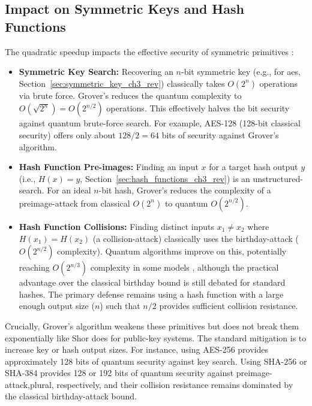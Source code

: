 \subsection{Impact on Symmetric Keys and Hash Functions}\label{subsec:grover_impact_specific_ch5_rev}
\begin{sloppypar}
The quadratic speedup impacts the effective security of symmetric primitives \parencite{bernstein2017post}:
\begin{itemize}
    \item \textbf{Symmetric Key Search:} Recovering an $n$-bit symmetric key (e.g., for \gls{aes}, Section~\ref{sec:symmetric_key_ch3_rev}) classically takes $O(2^n)$ operations via brute force. Grover's reduces the quantum complexity to $O(\sqrt{2^n}) = O(2^{n/2})$ operations. This effectively halves the bit security against quantum brute-force search. For example, AES-128 (128-bit classical security) offers only about $128/2 = 64$ bits of security against Grover's algorithm.
    \item \textbf{Hash Function Pre-images:} Finding an input $x$ for a target hash output $y$ (i.e., $H(x)=y$, Section~\ref{sec:hash_functions_ch3_rev}) is an \gls{unstructured-search}. For an ideal $n$-bit hash, Grover's reduces the complexity of a \gls{preimage-attack} from classical $O(2^n)$ to quantum $O(2^{n/2})$.
    \item \textbf{Hash Function Collisions:} Finding distinct inputs $x_1 \neq x_2$ where $H(x_1)=H(x_2)$ (a \gls{collision-attack}) classically uses the \gls{birthday-attack} ($O(2^{n/2})$ complexity). Quantum algorithms improve on this, potentially reaching $O(2^{n/3})$ complexity in some models \parencite{bernstein2017post}, although the practical advantage over the classical birthday bound is still debated for standard hashes. The primary defense remains using a hash function with a large enough output size ($n$) such that $n/2$ provides sufficient collision resistance.
\end{itemize}
Crucially, Grover's algorithm weakens these primitives but does not break them exponentially like Shor does for public-key systems. The standard mitigation is to increase key or hash output sizes. For instance, using AES-256 provides approximately 128 bits of quantum security against key search. Using SHA-256 or SHA-384 provides 128 or 192 bits of quantum security against \gls{preimage-attack,plural}, respectively, and their collision resistance remains dominated by the classical \gls{birthday-attack} bound.
\end{sloppypar}

